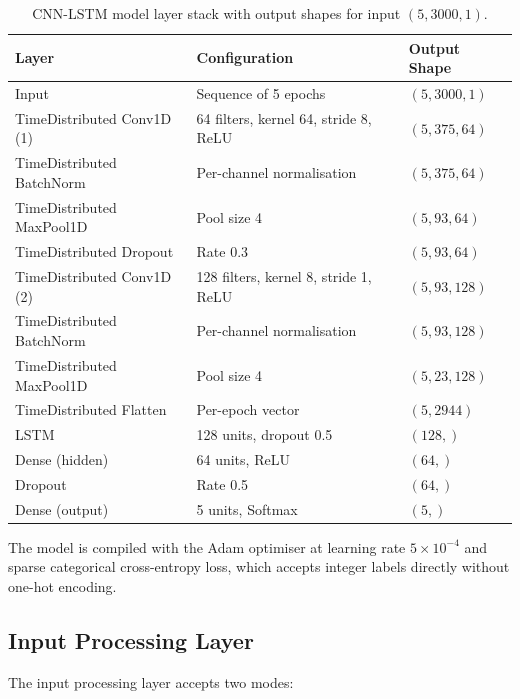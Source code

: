 \documentclass[10pt]{article}
\begin{document}
\begin{table}[h]
\centering
\small
\renewcommand{\arraystretch}{1.2}
\begin{tabular}{|l|l|l|}
\hline
\textbf{Layer} & \textbf{Configuration} & \textbf{Output Shape} \\\hline
Input & Sequence of 5 epochs & $(5, 3000, 1)$ \\\hline
TimeDistributed Conv1D (1) & 64 filters, kernel 64, stride 8, ReLU & $(5, 375, 64)$ \\\hline
TimeDistributed BatchNorm & Per-channel normalisation & $(5, 375, 64)$ \\\hline
TimeDistributed MaxPool1D & Pool size 4 & $(5, 93, 64)$ \\\hline
TimeDistributed Dropout & Rate 0.3 & $(5, 93, 64)$ \\\hline
TimeDistributed Conv1D (2) & 128 filters, kernel 8, stride 1, ReLU & $(5, 93, 128)$ \\\hline
TimeDistributed BatchNorm & Per-channel normalisation & $(5, 93, 128)$ \\\hline
TimeDistributed MaxPool1D & Pool size 4 & $(5, 23, 128)$ \\\hline
TimeDistributed Flatten & Per-epoch vector & $(5, 2944)$ \\\hline
LSTM & 128 units, dropout 0.5 & $(128,)$ \\\hline
Dense (hidden) & 64 units, ReLU & $(64,)$ \\\hline
Dropout & Rate 0.5 & $(64,)$ \\\hline
Dense (output) & 5 units, Softmax & $(5,)$ \\\hline
\end{tabular}
\caption{CNN-LSTM model layer stack with output shapes for input $(5,3000,1)$.}
\label{tab:model-arch}
\end{table}

The model is compiled with the Adam optimiser at learning rate $5 \times 10^{-4}$ and sparse categorical cross-entropy loss, which accepts integer labels directly without one-hot encoding.

\subsection{Input Processing Layer}
\label{sec:inputLayer}

The input processing layer accepts two modes:
\end{document}
